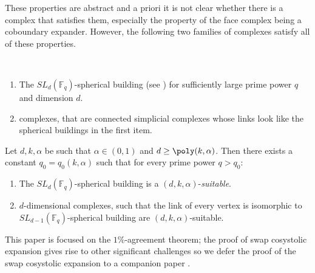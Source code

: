 These properties are abstract and a priori it is not clear whether there is a complex that satisfies them, especially the property of the face complex being a coboundary expander. However, the following two families of complexes satisfy all of these properties.
\begin{example}~
    \begin{enumerate}
    \item The \(SL_d(\mathbb{F}_q)\)-spherical building (see ) for sufficiently large prime power \(q\) and dimension \(d\). 
    \item \cite{LubotzkySV2005b} complexes, that are connected simplicial complexes whose links look like the spherical buildings in the first item.
\end{enumerate}
\end{example}

\begin{theorem} \label{thm:spherical-building-and-LSV-complexes-are-suitable}
Let \(d,k,\alpha\) be such that \(\alpha \in (0,1)\) and \(d \geq \poly(k,\alpha)\). Then there exists a constant \(q_0=q_0(k,\alpha)\) such that for every prime power \(q>q_0\):
    \begin{enumerate}
        \item The \(SL_{d}(\mathbb{F}_q)\)-spherical building is a \((d,k,\alpha)\)-\emph{suitable}.
        \item \(d\)-dimensional \cite{LubotzkySV2005b} complexes, such that the link of every vertex is isomorphic to \(SL_{d-1}(\mathbb{F}_q)\)-spherical building are \((d,k,\alpha)\)-suitable. 
    \end{enumerate}
\end{theorem}
This paper is focused on the \(1\%\)-agreement theorem; the proof of swap cosystolic expansion gives rise to other significant challenges so we defer the proof of the swap cosystolic expansion to a companion paper \cite{DiksteinD2023b}.


